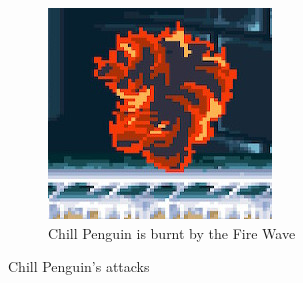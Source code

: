 \begin{figure}[htp]
\begin{subfigure}[t]{0.35\textwidth}
		\includegraphics[width=\linewidth]{figures/X1/Chill_penguin/Chill_burn.jpg}
		\caption{Chill Penguin is burnt by the Fire Wave}
	\end{subfigure}
	\caption{Chill Penguin's attacks}
\end{figure}
